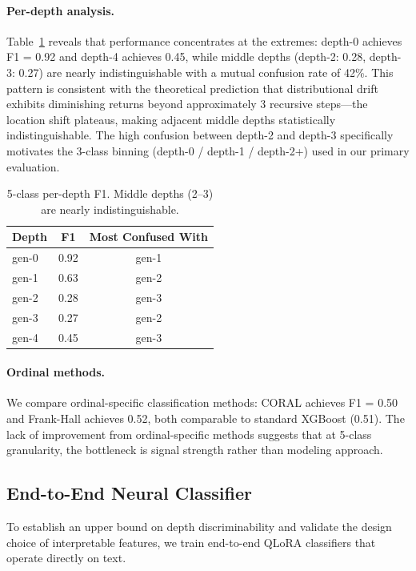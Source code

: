 \documentclass[11pt,a4paper]{article}
\begin{document}
\paragraph{Per-depth analysis.} Table~\ref{tab:perclass} reveals that performance concentrates at the extremes: depth-0 achieves F1 = 0.92 and depth-4 achieves 0.45, while middle depths (depth-2: 0.28, depth-3: 0.27) are nearly indistinguishable with a mutual confusion rate of 42\%. This pattern is consistent with the theoretical prediction that distributional drift exhibits diminishing returns beyond approximately 3 recursive steps---the location shift plateaus, making adjacent middle depths statistically indistinguishable. The high confusion between depth-2 and depth-3 specifically motivates the 3-class binning (depth-0 / depth-1 / depth-2+) used in our primary evaluation.

\begin{table}[t]
\centering
\caption{5-class per-depth F1. Middle depths (2--3) are nearly indistinguishable.}
\label{tab:perclass}
\begin{tabular}{lcc}
\toprule
Depth & F1 & Most Confused With \\
\midrule
gen-0 & 0.92 & gen-1 \\
gen-1 & 0.63 & gen-2 \\
gen-2 & 0.28 & gen-3 \\
gen-3 & 0.27 & gen-2 \\
gen-4 & 0.45 & gen-3 \\
\bottomrule
\end{tabular}
\end{table}

\paragraph{Ordinal methods.} We compare ordinal-specific classification methods: CORAL achieves F1 = 0.50 and Frank-Hall achieves 0.52, both comparable to standard XGBoost (0.51). The lack of improvement from ordinal-specific methods suggests that at 5-class granularity, the bottleneck is signal strength rather than modeling approach.

\subsection{End-to-End Neural Classifier}
\label{sec:e2e}

To establish an upper bound on depth discriminability and validate the design choice of interpretable features, we train end-to-end QLoRA classifiers that operate directly on text.
\end{document}
